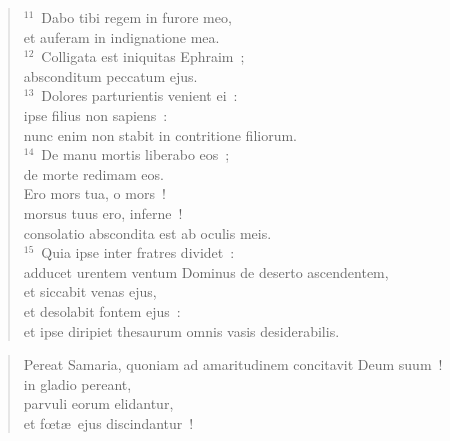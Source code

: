 \begin{flushleft}
\begin{verse}
${}^{11}$~Dabo tibi regem in furore meo,\\ et auferam in indignatione mea.\\
${}^{12}$~Colligata est iniquitas Ephraim~;\\ absconditum peccatum ejus.\\
${}^{13}$~Dolores parturientis venient ei~:\\ ipse filius non sapiens~:\\ nunc enim non stabit in contritione filiorum.\\
${}^{14}$~De manu mortis liberabo eos~;\\ de morte redimam eos.\\ Ero mors tua, o mors~!\\ morsus tuus ero, inferne~!\\ consolatio abscondita est ab oculis meis.\\
${}^{15}$~Quia ipse inter fratres dividet~:\\ adducet urentem ventum Dominus de deserto ascendentem,\\ et siccabit venas ejus,\\ et desolabit fontem ejus~:\\ et ipse diripiet thesaurum omnis vasis desiderabilis.\end{verse}\end{flushleft}


\begin{flushleft}\begin{verse}\vspace{-19pt}\hspace{6pt}Pereat Samaria, quoniam ad amaritudinem concitavit Deum suum~!\\\hspace{6pt} in gladio pereant,\\ parvuli eorum elidantur,\\ et fœt\ae\ ejus discindantur~!\end{verse}\end{flushleft}


